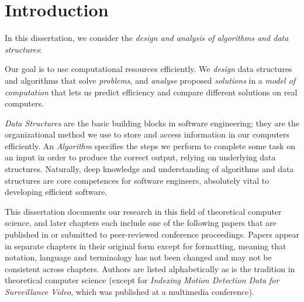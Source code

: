 \chapter{Introduction}
In this dissertation, we consider the \emph{design and analysis of algorithms and data structures}:


\begin{leftbar}
\noindent Our goal is to use computational resources efficiently. We \emph{design} data structures and algorithms that solve \emph{problems}, and \emph{analyse} proposed \emph{solutions} in a \emph{model of computation} that lets us predict efficiency and compare different solutions on real computers.
\end{leftbar}

\emph{Data Structures} are the basic building blocks in software engineering; they are the organizational method we use to store and access information in our computers efficiently. 
An \emph{Algorithm} specifies the steps we perform to complete some task on an input in order to produce the correct output, relying on underlying data structures. %
Naturally, deep knowledge and understanding of algorithms and data structures are core competences for software engineers, absolutely vital to developing efficient software. 

This dissertation documents our research in this field of theoretical computer science, and later chapters each include one of the following papers that are published in or submitted to peer-reviewed conference proceedings. 
Papers appear in separate chapters in their original form except for formatting, meaning that notation, language and terminology has not been changed and may not be consistent across chapters. 
Authors are listed alphabetically as is the tradition in theoretical computer science (except for \emph{Indexing Motion Detection Data for Surveillance Video}, which was published at a multimedia conference). 


